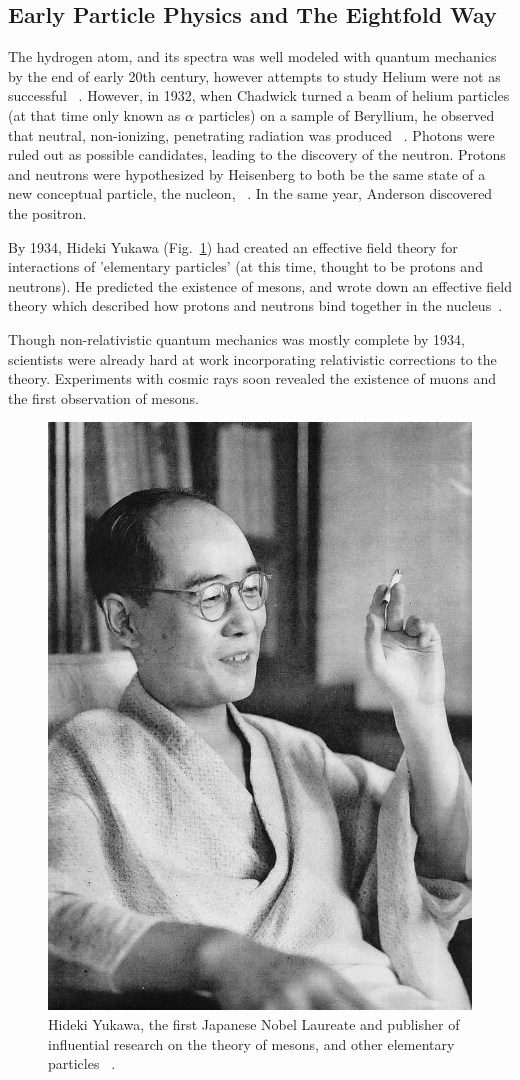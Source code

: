 \clearpage
\subsection{Early Particle Physics and The Eightfold Way}

The hydrogen atom, and its spectra was well modeled with quantum mechanics by
the end of early 20th century, however attempts to study Helium were not as
successful ~\needcite{}. However, in 1932,  when Chadwick turned a beam of
helium particles (at that time only known as $\alpha$ particles) on a sample of
Beryllium, he observed that neutral, non-ionizing, penetrating radiation was
produced ~\cite{Krauss2015}. Photons were ruled out as possible
candidates, leading to the discovery of the neutron. Protons and neutrons were
hypothesized by Heisenberg to both be the same state of a new conceptual
particle, the nucleon, ~\cite{Heisenberg1952}. In the same year, Anderson
discovered the positron. 

By 1934, Hideki Yukawa (Fig.~\ref{fig:hidekiyukawa}) had created an effective
field theory for interactions of 'elementary particles' (at this time, thought
to be protons and neutrons). He predicted the existence of mesons, and wrote
down an effective field theory which described how protons and neutrons bind
together in the nucleus~\cite{Yukawa1935}. 

Though non-relativistic quantum mechanics was mostly complete by 1934,
scientists were already hard at work incorporating relativistic corrections to
the theory. Experiments with cosmic rays soon revealed the existence of muons
and the first observation of mesons.

\begin{figure}[ht]
	\begin{center}
		\includegraphics[width=0.5\linewidth]{figures/hidekiyukawa.jpg}
		\caption{
			Hideki Yukawa, the first Japanese Nobel Laureate and publisher of
			influential research on the theory of mesons, and other elementary
			particles ~\cite{YukawaPhoto1952}.
		}
		\label{fig:hidekiyukawa}
	\end{center}
\end{figure}

